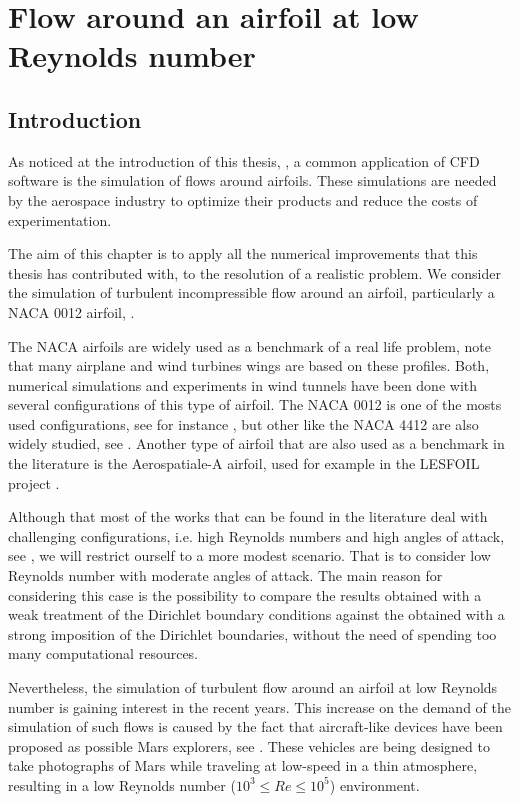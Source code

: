 \chapter{Flow around an airfoil at low Reynolds number}
\label{chap-NACA}

\section{Introduction}
\label{sec-C8_introduction}
As noticed at the introduction of this thesis, , a common application of CFD software is the simulation of flows around airfoils. These simulations are needed by the aerospace industry to optimize their products and reduce the costs of experimentation.

The aim of this chapter is to apply all the numerical improvements that this thesis has contributed with, to the resolution of a realistic problem. We consider the simulation of turbulent incompressible flow around an airfoil, particularly a NACA 0012 airfoil, \cite{NACA}.

The NACA airfoils are widely used as a benchmark of a real life problem, note that many airplane and wind turbines wings are based on these profiles. Both, numerical simulations and experiments in wind tunnels have been done with several configurations of this type of airfoil. The NACA 0012 is one of the mosts used configurations, see for instance \cite{Sheldahl,McCroskey,Rivera}, but other like the NACA 4412 are also widely studied, see \cite{Wadcock 1987 and Hasting and Williams (1984,1987)}. Another type of airfoil that are also used as a benchmark in the literature is the Aerospatiale-A airfoil, used for example in the LESFOIL project \cite{Davidson_2012}.

Although that most of the works that can be found in the literature deal with challenging configurations, i.e. high Reynolds numbers and high angles of attack, see \cite{jansen_stabilized_1999, kaltenbach_large-eddy_1995, schmidt_assessment_????,lesons_from_LESFOIL}, we will restrict ourself to a more modest scenario. That is to consider low Reynolds number with moderate angles of attack. The main reason for considering this case is the possibility to compare the results obtained with a weak treatment of the Dirichlet boundary conditions against the obtained with a strong imposition of the Dirichlet boundaries, without the need of spending too many computational resources.

Nevertheless, the simulation of turbulent flow around an airfoil at low Reynolds number is gaining interest in the recent years. This increase on the demand of the simulation of such flows is caused by the fact that aircraft-like devices have been proposed as possible Mars explorers, see \cite{Kojima,smith_2003,anyoji_2010}. These vehicles are being designed to take photographs of Mars while traveling at low-speed in a thin atmosphere, resulting in a low Reynolds number ($ 10^3\le Re\le10^5 $) environment.

